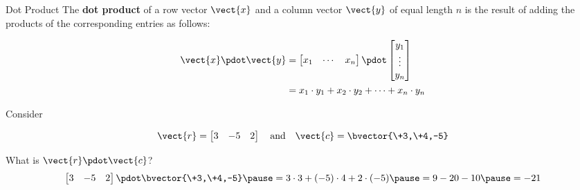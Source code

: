 \documentclass{beamer}
\begin{document}
\begin{frame}
\begin{block}{Dot Product}
The \textbf{dot product} of a row vector $\vect{x}$ and a column vector $\vect{y}$ of equal length $n$ is the result of adding the products of the corresponding entries as follows:

\vspace{-10mm}
\begin{equation*}
\begin{split}
\vect{x}\pdot\vect{y}&=\begin{bmatrix}x_1&\cdots&x_n\end{bmatrix}\pdot
\begin{bmatrix}y_1\\\vdots\\y_n\end{bmatrix}\\
&=x_1\cdot y_1+x_2\cdot y_2+\cdots +x_n\cdot y_n\\
\end{split}
\end{equation*}
\end{block}\pause
\begin{example}
Consider

\vspace{-5mm}
\begin{equation*}
\vect{r}=
\begin{bmatrix}
3 & -5 & 2
\end{bmatrix}
\quad\text{and}\quad
\vect{c}=\bvector{\+3,\+4,-5}
\end{equation*}

\vspace{-6mm}
What is $\vect{r}\pdot\vect{c}$?\pause
\begin{equation*}
\begin{bmatrix}
3 & -5 & 2
\end{bmatrix}
\pdot\bvector{\+3,\+4,-5}\pause
=3\cdot 3+(-5)\cdot 4+2\cdot(-5)\pause
=9-20-10\pause
=-21
\end{equation*}

\vspace{-4mm}
\end{example}
\end{frame}
\end{document}

